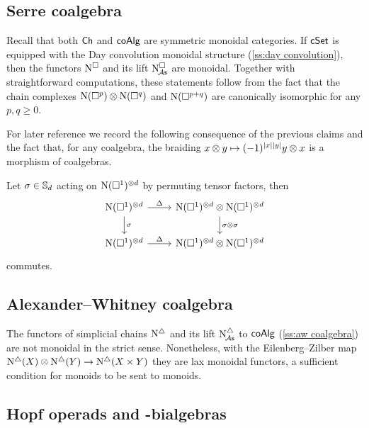 \subsection{Serre coalgebra} \label{ss:serre coalgebra sym monoidal}

Recall that both $\Ch$ and $\coAlg$ are symmetric monoidal categories.
If $\cSet$ is equipped with the Day convolution monoidal structure (\cref{ss:day convolution}), then the functors $\cchains$ and its lift $\cchainsA$ are monoidal.
Together with straightforward computations, these statements follow from the fact that the chain complexes $\chains(\cube^p) \otimes \chains(\cube^q)$ and $\chains(\cube^{p+q})$ are canonically isomorphic for any $p, q \geq 0$.

For later reference we record the following consequence of the previous claims and the fact that, for any coalgebra, the braiding $x \otimes y \mapsto (-1)^{\bars{x} \bars{y}} y \otimes x$ is a morphism of coalgebras.

\begin{lemma} \label{l:serre diagonal invariant}
	Let $\sigma \in \S_d$ acting on $\chains(\cube^1)^{\otimes d}$ by permuting tensor factors, then
	\[
	\begin{tikzcd}
		\chains(\cube^1)^{\otimes d} \arrow[r, "\Delta"] \arrow[d, "\sigma"] &
		\chains(\cube^1)^{\otimes d} \otimes \chains(\cube^1)^{\otimes d} \arrow[d, "\sigma \otimes \sigma"] \\
		\chains(\cube^1)^{\otimes d} \arrow[r, "\Delta"] &
		\chains(\cube^1)^{\otimes d} \otimes \chains(\cube^1)^{\otimes d}
	\end{tikzcd}
	\]
	commutes.
\end{lemma}

\subsection{Alexander--Whitney coalgebra}

The functors of simplicial chains $\schains$ and its lift $\schainsA$ to $\coAlg$ (\cref{ss:aw coalgebra}) are not monoidal in the strict sense.
Nonetheless, with the Eilenberg--Zilber map $\schains(X) \otimes \schains(Y) \to \schains(X \times Y)$ they are lax monoidal functors, a sufficient condition for monoids to be sent to monoids.

\subsection{Hopf operads and \pdfEinfty-bialgebras}

